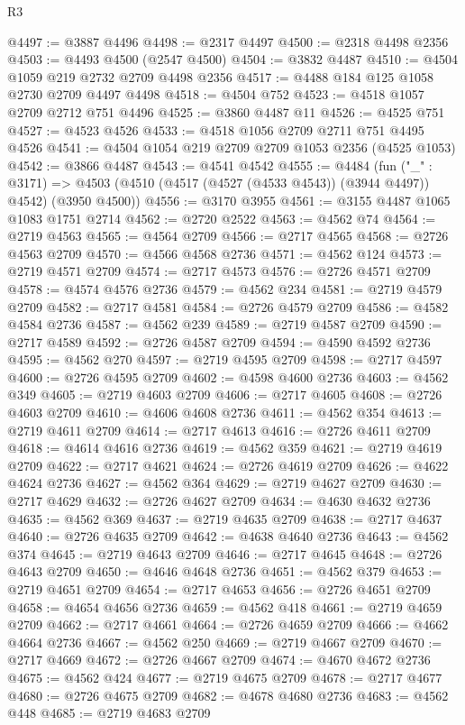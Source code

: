 \begin{lexlean}{R3}
\begin{coremodule}
@4497 := @3887 @4496
@4498 := @2317 @4497
@4500 := @2318 @4498 @2356
@4503 := @4493 @4500 (@2547 @4500)
@4504 := @3832 @4487
@4510 := @4504 @1059 @219 @2732 @2709 @4498 @2356
@4517 := @4488 @184 @125 @1058 @2730 @2709 @4497 @4498
@4518 := @4504 @752
@4523 := @4518 @1057 @2709 @2712 @751 @4496
@4525 := @3860 @4487 @11
@4526 := @4525 @751
@4527 := @4523 @4526
@4533 := @4518 @1056 @2709 @2711 @751 @4495 @4526
@4541 := @4504 @1054 @219 @2709 @2709 @1053 @2356 (@4525 @1053)
@4542 := @3866 @4487
@4543 := @4541 @4542
@4555 := @4484
    (fun ("_" : @3171) =>
    @4503 (@4510 (@4517 (@4527 (@4533 @4543)) (@3944 @4497)) @4542) (@3950 @4500))
@4556 := @3170 @3955
@4561 := @3155 @4487 @1065 @1083 @1751 @2714
@4562 := @2720 @2522
@4563 := @4562 @74
@4564 := @2719 @4563
@4565 := @4564 @2709
@4566 := @2717 @4565
@4568 := @2726 @4563 @2709
@4570 := @4566 @4568 @2736
@4571 := @4562 @124
@4573 := @2719 @4571 @2709
@4574 := @2717 @4573
@4576 := @2726 @4571 @2709
@4578 := @4574 @4576 @2736
@4579 := @4562 @234
@4581 := @2719 @4579 @2709
@4582 := @2717 @4581
@4584 := @2726 @4579 @2709
@4586 := @4582 @4584 @2736
@4587 := @4562 @239
@4589 := @2719 @4587 @2709
@4590 := @2717 @4589
@4592 := @2726 @4587 @2709
@4594 := @4590 @4592 @2736
@4595 := @4562 @270
@4597 := @2719 @4595 @2709
@4598 := @2717 @4597
@4600 := @2726 @4595 @2709
@4602 := @4598 @4600 @2736
@4603 := @4562 @349
@4605 := @2719 @4603 @2709
@4606 := @2717 @4605
@4608 := @2726 @4603 @2709
@4610 := @4606 @4608 @2736
@4611 := @4562 @354
@4613 := @2719 @4611 @2709
@4614 := @2717 @4613
@4616 := @2726 @4611 @2709
@4618 := @4614 @4616 @2736
@4619 := @4562 @359
@4621 := @2719 @4619 @2709
@4622 := @2717 @4621
@4624 := @2726 @4619 @2709
@4626 := @4622 @4624 @2736
@4627 := @4562 @364
@4629 := @2719 @4627 @2709
@4630 := @2717 @4629
@4632 := @2726 @4627 @2709
@4634 := @4630 @4632 @2736
@4635 := @4562 @369
@4637 := @2719 @4635 @2709
@4638 := @2717 @4637
@4640 := @2726 @4635 @2709
@4642 := @4638 @4640 @2736
@4643 := @4562 @374
@4645 := @2719 @4643 @2709
@4646 := @2717 @4645
@4648 := @2726 @4643 @2709
@4650 := @4646 @4648 @2736
@4651 := @4562 @379
@4653 := @2719 @4651 @2709
@4654 := @2717 @4653
@4656 := @2726 @4651 @2709
@4658 := @4654 @4656 @2736
@4659 := @4562 @418
@4661 := @2719 @4659 @2709
@4662 := @2717 @4661
@4664 := @2726 @4659 @2709
@4666 := @4662 @4664 @2736
@4667 := @4562 @250
@4669 := @2719 @4667 @2709
@4670 := @2717 @4669
@4672 := @2726 @4667 @2709
@4674 := @4670 @4672 @2736
@4675 := @4562 @424
@4677 := @2719 @4675 @2709
@4678 := @2717 @4677
@4680 := @2726 @4675 @2709
@4682 := @4678 @4680 @2736
@4683 := @4562 @448
@4685 := @2719 @4683 @2709

\end{coremodule}
\end{lexlean}
